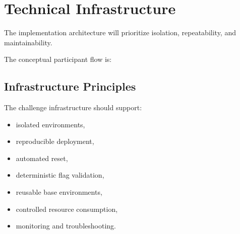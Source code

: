 \documentclass[11pt,a4paper]{article}
\begin{document}
\section{Technical Infrastructure}

The implementation architecture will prioritize isolation,
repeatability, and maintainability.

The conceptual participant flow is:

\begin{center}


\end{center}


\subsection{Infrastructure Principles}

The challenge infrastructure should support:

\begin{itemize}

    \item isolated environments,

    \item reproducible deployment,

    \item automated reset,

    \item deterministic flag validation,

    \item reusable base environments,

    \item controlled resource consumption,

    \item monitoring and troubleshooting.

\end{itemize}
\end{document}

